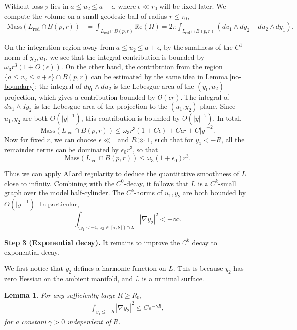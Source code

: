 \documentclass[11pt]{article}
\newtheorem{lemma}{Lemma}
\begin{document}
Without loss $p$ lies in $a\leq u_2\leq a+\epsilon$, where $\epsilon\ll r_0$ will be fixed later. 
We compute the volume on a small geodesic ball of radius $r\leq r_0$,
\begin{align*}
    \text{Mass}(L_{\text{red}} \cap B(p,r)) &= \int_{L_{\text{red}} \cap B(p,r)} \text{Re}(\Omega) =  2\pi\int_{L_{\text{red}} \cap B(p,r)} (du_1\wedge dy_2-du_2\wedge dy_1).
\end{align*}

On the integration region away from $a\leq u_2\leq a+\epsilon$, by the smallness of the $C^1$-norm of $y_2,u_1$, we see that the integral contribution is bounded by $\omega_3 r^3(1+O(\epsilon))$. On the other hand, the contribution from the region $\{a\leq u_2\leq a+\epsilon\} \cap B(p,r) $ can be estimated by the same idea in Lemma \ref{no-boundary}: the integral of $dy_1\wedge du_2$ is  the Lebesgue area of the $(y_1, u_2)$ projection, which gives a contribution bounded by $O(\epsilon r)$.  The integral of $du_1\wedge dy_2$ is the Lebesgue area of the projection to the $(u_1,y_2)$ plane. Since $u_1,y_2$ are both $O(|y|^{-1})$, this contribution is bounded by $O(|y|^{-2})$. In total,
\[
 \text{Mass}(L_{\text{red}} \cap B(p,r)) \leq \omega_3 r^3(1+C\epsilon) +C\epsilon r+ C|y|^{-2}. 
\]
Now for fixed $r$, we can choose $\epsilon\ll 1$ and $R\gg 1$, such that for $y_1<-R$, all the remainder terms can be dominated by $\epsilon_0 r^3$, so  that
\[
 \text{Mass}(L_{\text{red}} \cap B(p,r)) \leq \omega_3(1+\epsilon_0) r^3.
\]


Thus we can apply Allard regularity to deduce the quantitative smoothness of $L$ close to infinity. Combining with the $C^0$-decay, it follows that $L$ is a $C^k$-small graph over the model half-cylinder.
The $C^k$-norms of $u_1,y_2$  are both bounded by $O(|y|^{-1}).$ In particular, 
\[
\int_{\{ y_1< -1, u_2\in [a,b] \}\cap L  } |\nabla y_2|^2<+\infty.
\]





\textbf{Step 3 (Exponential decay).} It remains to improve the $C^k$ decay to exponential decay. 



We first notice that $y_2$ defines a harmonic function on $L$. This is because $y_2$ has zero Hessian on the ambient manifold, and $L$ is a minimal surface. 



\begin{lemma}
For any sufficiently large $R\geq R_0$,
    \begin{align}\label{Caccioppoli}
        \int_{ y_1 \leq - R } |\nabla y_2|^2 \leq Ce^{-\gamma R},
    \end{align}
    for a constant $\gamma>0$ independent of $R$.
\end{lemma}
\end{document}
